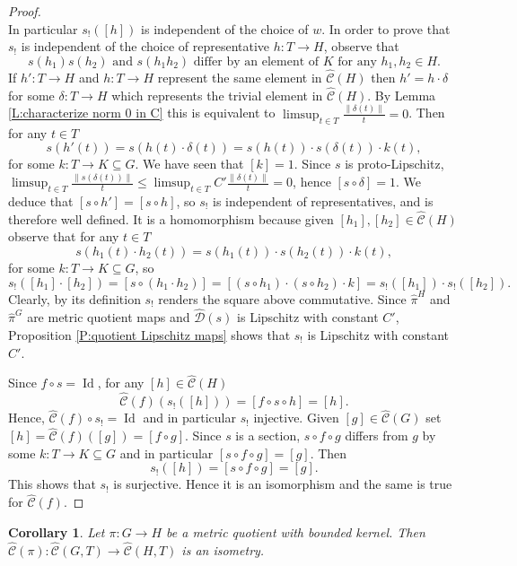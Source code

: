 \documentclass[12pt]{amsart}
\newtheorem{cor}[prop]{Corollary}
\theoremstyle{definition}
\newcommand{\OP}[1]{\operatorname{#1}}
\def\D{\mathcal{D}}
\def\tC{\hat{\mathcal{C}}}
\def\tD{\hat{\D}}
\begin{document}
\begin{proof}
\[\]
In particular $s_!([h])$ is independent of the choice of $w$.
In order to prove that $s_!$ is independent of the choice of representative $h \colon T \to H$, observe that 
\[
\text{$s(h_1)s(h_2)$ and $s(h_1h_2)$ differ by an element of $K$ for any $h_1,h_2 \in H$.}
\]
If $h' \colon T \to H$ and $h \colon T \to H$ represent the same element in $\tC(H)$ then $h'=h \cdot \delta$ for some $\delta \colon T \to H$ which represents the trivial element in $\tC(H)$.
By Lemma \ref{L:characterize norm 0 in C} this is equivalent to $\limsup_{t \in T} \tfrac{\|\delta(t)\|}{t}=0$.
Then for any $t \in T$
\[
s(h'(t))=s(h(t)\cdot \delta(t)) = s(h(t)) \cdot s(\delta(t)) \cdot k(t),
\]
for some $k \colon T \to K \subseteq G$.
We have seen that $[k]=1$.
Since $s$ is proto-Lipschitz, $\limsup_{t \in T} \tfrac{\|s(\delta(t))\|}{t} \leq \limsup_{t \in T} C'\tfrac{\|\delta(t)\|}{t} =0$, hence $[s \circ \delta]=1$.
We deduce that $[s \circ h']=[s \circ h]$, so $s_!$ is independent of representatives, and is therefore well defined.
It is a homomorphism because given $[h_1],[h_2] \in \tC(H)$ observe that for any $t \in T$
\[
s(h_1(t) \cdot h_2(t)) = s(h_1(t)) \cdot s(h_2(t)) \cdot k(t),
\]
for some $k \colon T \to K \subseteq G$, so 
\[
s_!([h_1]\cdot [h_2]) = [s \circ (h_1 \cdot h_2)] = [(s \circ h_1) \cdot (s \circ h_2) \cdot k] = s_!([h_1]) \cdot s_!([h_2]).
\]
Clearly, by its definition $s_!$ renders the square above commutative.
Since $\hat{\pi}^H$ and $\hat{\pi}^G$ are metric quotient maps and $\tD(s)$ is Lipschitz with constant $C'$, Proposition \ref{P:quotient Lipschitz maps} shows that $s_!$ is Lipschitz with constant $C'$.

Since $f \circ s=\OP{Id}$, for any $[h] \in \tC(H)$
\[
\tC(f) (s_!([h])) = [f \circ s \circ h] = [h].
\]
Hence, $\tC(f) \circ s_!=\OP{Id}$ and in particular $s_!$ injective.
Given $[g] \in \tC(G)$ set $[h]=\tC(f)([g])=[f \circ g]$.
Since $s$ is a section, $s \circ f \circ g$ differs from $g$ by some $k \colon T \to K \subseteq G$ and in particular $[s \circ f \circ g]=[g]$.
Then
\[
s_!([h]) = [s \circ f \circ g] = [g].
\]
This shows that $s_!$ is surjective.
Hence it is an isomorphism and the same is true for $\tC(f)$.
\end{proof}



\begin{cor}\label{cor:metric quotient bounded kernel}
Let $\pi \colon G \to H$ be a metric quotient with bounded kernel.
Then $\tC(\pi) \colon \tC(G,T) \to \tC(H,T)$ is an isometry. 
\end{cor}
\end{document}
